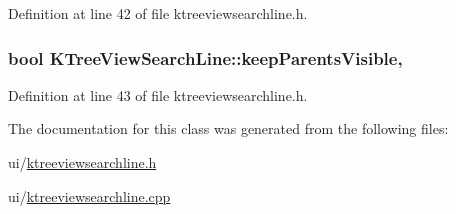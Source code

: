 Definition at line 42 of file ktreeviewsearchline.\+h.

\hypertarget{classKTreeViewSearchLine_a51e8d818d4b5541f1d6e50552ba1cf6c}{
\subsubsection[{keep\+Parents\+Visible}]{\setlength{\rightskip}{0pt plus 5cm}bool K\+Tree\+View\+Search\+Line\+::keep\+Parents\+Visible\hspace{0.3cm}{\ttfamily [read]}, {\ttfamily [write]}}}\label{classKTreeViewSearchLine_a51e8d818d4b5541f1d6e50552ba1cf6c}


Definition at line 43 of file ktreeviewsearchline.\+h.



The documentation for this class was generated from the following files\+:\begin{DoxyCompactItemize}
\item 
ui/\hyperlink{ktreeviewsearchline_8h}{ktreeviewsearchline.\+h}\item 
ui/\hyperlink{ktreeviewsearchline_8cpp}{ktreeviewsearchline.\+cpp}\end{DoxyCompactItemize}
